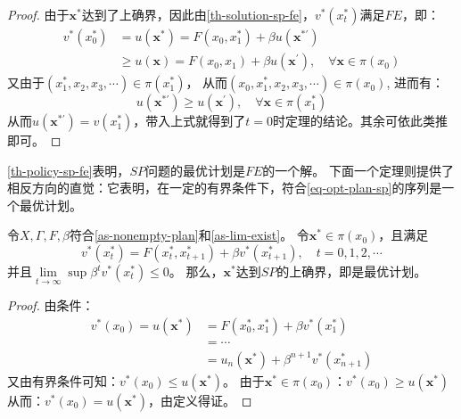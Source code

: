 \begin{proof}
    由于$\boldsymbol{x}^*$达到了上确界，因此由\cref{th-solution-sp-fe}，$v^*\left(x_t^*\right)$满足$FE$，即：
    \begin{equation*}
        \begin{aligned}
            v^*\left(x_0^*\right) &= u\left(\boldsymbol{x}^*\right) = F\left(x_0,x_1^*\right) 
                + \beta u\left(\boldsymbol{x^{*\prime}}\right) \\
            &\geq u\left(\boldsymbol{x}\right) = F\left(x_0,x_1\right)+\beta u\left(\boldsymbol{x}^{\prime}\right), 
            \quad \forall \boldsymbol{x}\in \pi\left(x_0\right)
        \end{aligned}
    \end{equation*}
    又由于$\left(x_1^*,x_2,x_3,\cdots\right)\in \pi\left(x_1^*\right)$，
    从而$\left(x_0,x_1^*,x_2,x_3,\cdots\right)\in \pi\left(x_0\right)$,
    进而有：
    $$u\left(\boldsymbol{x}^{*\prime}\right) \geq u\left(\boldsymbol{x}^{\prime}\right), 
        \quad \forall \boldsymbol{x}\in \pi\left(x_1^*\right)$$
    从而$u\left(\boldsymbol{x}^{*\prime}\right)=v\left(x_1^*\right)$，带入上式就得到了$t=0$时定理的结论。其余可依此类推即可。
\end{proof}

\cref{th-policy-sp-fe}表明，$SP$问题的最优计划是$FE$的一个解。
下面一个定理则提供了相反方向的直觉：它表明，在一定的有界条件下，符合\cref{eq-opt-plan-sp}的序列是一个最优计划。

\begin{theorem} \label{th-policy-fe-sp}
    令$X, \Gamma, F, \beta$符合\cref{as-nonempty-plan}和\cref{as-lim-exist}。
    令$\boldsymbol{x}^*\in \pi\left(x_0\right)$，且满足
    $$v^*\left(x_t^*\right) = F\left(x_t^*,x_{t+1}^*\right) + \beta v^*\left(x_{t+1}^*\right), \quad t=0,1,2,\cdots$$
    并且$\lim\limits_{t\rightarrow\infty}\sup\beta^t v^*\left(x_t^*\right)\leq 0$。
    那么，$\boldsymbol{x}^*$达到$SP$的上确界，即是最优计划。
\end{theorem}
\begin{proof}
    由条件：
    \begin{equation*}
        \begin{aligned}
            v^*\left(x_0\right) = u\left(\boldsymbol{x}^*\right)&= F\left(x_0^*,x_1^*\right)
                +\beta v^*\left(x_1^*\right) \\
            &= \cdots \\
            &= u_n\left(\boldsymbol{x}^*\right) + \beta^{n+1}v^*\left(x_{n+1}^*\right)
        \end{aligned}
    \end{equation*}
    又由有界条件可知：$v^*\left(x_0\right)\leq u\left(\boldsymbol{x}^*\right)$。
    由于$\boldsymbol{x}^*\in \pi\left(x_0\right)$：$v^*\left(x_0\right)\geq u\left(\boldsymbol{x}^*\right)$
    从而：$v^*\left(x_0\right) = u\left(\boldsymbol{x}^*\right)$，由定义得证。
\end{proof}


